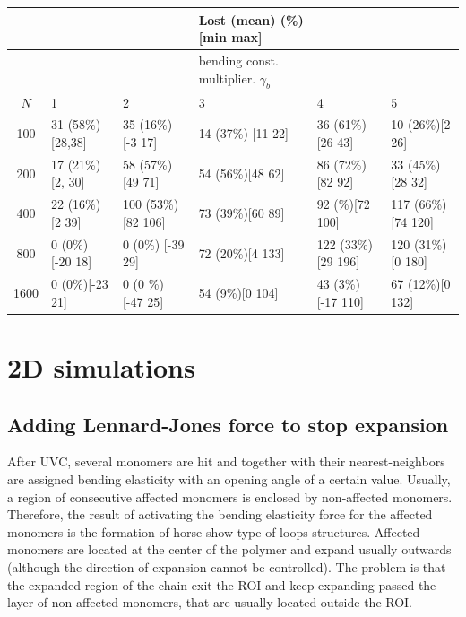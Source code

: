 \documentclass[12pt]{report}
\begin{document}
	 
	  \begin{table}[H]
	  	\tiny{
	  		\begin{tabular}{c| l l l l l}
	  			&           & & Lost (mean) (\%)[min max]& &  \\
	  			\hline
	  			&           & & bending const. multiplier. $\gamma_b$ & &  \\
	  			\hline 
	  			$N$ 	   &            1 & 2 & 3 & 4& 5 \\   	 
	  			\hline 
	  			100 & 31 (58\%) [28,38] & 35 (16\%)[-3 17]    & 14 (37\%) [11 22] & 36 (61\%)[26 43]   & 10 (26\%)[2 26]\\
	  			200 & 17 (21\%) [2, 30] & 58 (57\%)[49 71]    & 54 (56\%)[48 62]  & 86 (72\%) [82 92]  & 33 (45\%)[28 32]\\
	  			400 & 22 (16\%) [2 39]  & 100 (53\%) [82 106] & 73 (39\%)[60 89]  & 92 (\%)[72 100]    & 117 (66\%)[74 120] \\
	  			800 &  0 (0\%) [-20 18] & 0 (0\%) [-39 29]    & 72 (20\%)[4 133]  & 122 (33\%)[29 196] & 120 (31\%)[0 180]\\
	  			1600&  0 (0\%)[-23 21]  & 0 (0 \%) [-47 25]   & 54 (9\%)[0 104]   & 43 (3\%)[-17 110]  & 67 (12\%)[0 132]\\
	  		\end{tabular}
	  	}
	  \end{table}
	  
	\section{2D simulations}
		
		
	\subsection{Adding Lennard-Jones force to stop expansion}
      After UVC, several monomers are hit and together with their nearest-neighbors are assigned bending elasticity with an opening angle of a certain value. Usually, a region of consecutive affected monomers is enclosed by non-affected monomers. Therefore, the result of activating the bending elasticity force for the affected monomers is the formation of horse-show type of loops structures. 
      Affected monomers are located at the center of the polymer and expand usually outwards (although the direction of expansion cannot be controlled). The problem is that the expanded region of the chain exit the ROI and keep expanding passed the layer of non-affected monomers, that are usually located outside the ROI. 
      
\end{document}
